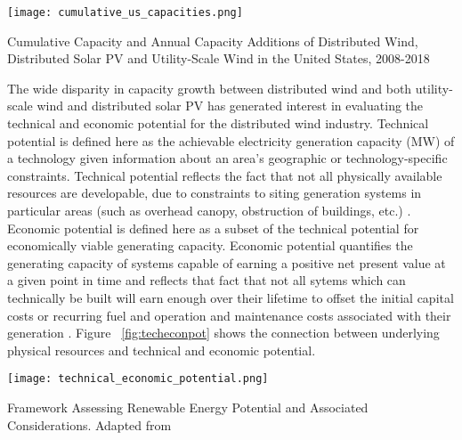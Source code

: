 \begin{conditionalfigure}[!htb]
  \centering
 	\texttt{[image: cumulative\_us\_capacities.png]}
	\caption{Cumulative Capacity and Annual Capacity Additions of Distributed Wind, Distributed Solar PV and Utility-Scale Wind in the United States, 2008-2018}
	\label{fig:cumcaps}
\end{conditionalfigure}

The wide disparity in capacity growth between distributed wind and both utility-scale wind and distributed solar PV has generated interest in evaluating the technical and economic potential for the distributed wind industry. Technical potential is defined here as the achievable electricity generation capacity (MW) of a technology given information about an area's geographic or technology-specific constraints. Technical potential reflects the fact that not all physically available resources are developable, due to constraints to siting generation systems in particular areas (such as overhead canopy, obstruction of buildings, etc.) \cite{lee_exploring_2019}. Economic potential is defined here as a subset of the technical potential for economically viable generating capacity. Economic potential quantifies the generating capacity of systems capable of earning a positive net present value at a given point in time and reflects that fact that not all sytems which can technically be built will earn enough over their lifetime to offset the initial capital costs or recurring fuel and operation and maintenance costs associated with their generation \cite{mccabe_assessment_2018}. Figure ~\ref{fig:techeconpot} shows the connection between underlying physical resources and technical and economic potential.

\begin{conditionalfigure}[!htb]
  \centering
	  \texttt{[image: technical\_economic\_potential.png]}
	  \caption{Framework Assessing Renewable Energy Potential and Associated Considerations. Adapted from \cite{lopez_us_2012}}
	  \label{fig:techeconpot}
\end{conditionalfigure}

